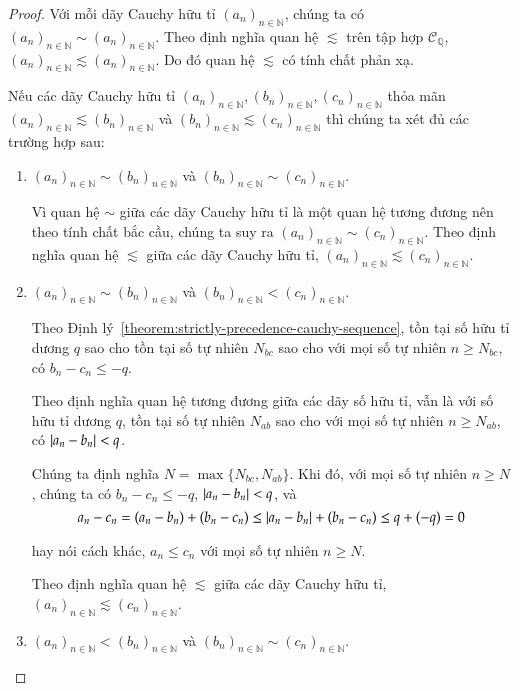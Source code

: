 \begin{proof}
    Với mỗi dãy Cauchy hữu tỉ ${(a_{n})}_{n\in\mathbb{N}}$, chúng ta có ${(a_{n})}_{n\in\mathbb{N}} \sim {(a_{n})}_{n\in\mathbb{N}}$. Theo định nghĩa quan hệ $\lesssim$ trên tập hợp $\mathscr{C}_{\mathbb{Q}}$, ${(a_{n})}_{n\in\mathbb{N}} \lesssim {(a_{n})}_{n\in\mathbb{N}}$. Do đó quan hệ $\lesssim$ có tính chất phản xạ.

    Nếu các dãy Cauchy hữu tỉ ${(a_{n})}_{n\in\mathbb{N}}, {(b_{n})}_{n\in\mathbb{N}}, {(c_{n})}_{n\in\mathbb{N}}$ thỏa mãn ${(a_{n})}_{n\in\mathbb{N}}\lesssim {(b_{n})}_{n\in\mathbb{N}}$ và ${(b_{n})}_{n\in\mathbb{N}}\lesssim {(c_{n})}_{n\in\mathbb{N}}$ thì chúng ta xét đủ các trường hợp sau:
    \begin{enumerate}[label={\textbf{Trường hợp \arabic*.}},itemindent=2cm]
        \item ${(a_{n})}_{n\in\mathbb{N}}\sim {(b_{n})}_{n\in\mathbb{N}}$ và ${(b_{n})}_{n\in\mathbb{N}}\sim {(c_{n})}_{n\in\mathbb{N}}$.

              Vì quan hệ $\sim$ giữa các dãy Cauchy hữu tỉ là một quan hệ tương đương nên theo tính chất bắc cầu, chúng ta suy ra ${(a_{n})}_{n\in\mathbb{N}}\sim {(c_{n})}_{n\in\mathbb{N}}$. Theo định nghĩa quan hệ $\lesssim$ giữa các dãy Cauchy hữu tỉ, ${(a_{n})}_{n\in\mathbb{N}}\lesssim {(c_{n})}_{n\in\mathbb{N}}$.
        \item ${(a_{n})}_{n\in\mathbb{N}}\sim {(b_{n})}_{n\in\mathbb{N}}$ và ${(b_{n})}_{n\in\mathbb{N}} < {(c_{n})}_{n\in\mathbb{N}}$.

              Theo Định lý~\ref{theorem:strictly-precedence-cauchy-sequence}, tồn tại số hữu tỉ dương $q$ sao cho tồn tại số tự nhiên $N_{bc}$ sao cho với mọi số tự nhiên $n\geq N_{bc}$, có $b_{n} - c_{n}\leq -q$.

              Theo định nghĩa quan hệ tương đương giữa các dãy số hữu tỉ, vẫn là với số hữu tỉ dương $q$, tồn tại số tự nhiên $N_{ab}$ sao cho với mọi số tự nhiên $n\geq N_{ab}$, có $\left\vert{a_{n} - b_{n}}\right\vert < q$.

              Chúng ta định nghĩa $N = \max\{ N_{bc}, N_{ab} \}$. Khi đó, với mọi số tự nhiên $n\geq N$, chúng ta có $b_{n} - c_{n}\leq -q$, $\left\vert{a_{n} - b_{n}}\right\vert < q$, và
              \[
                  a_{n} - c_{n} = (a_{n} - b_{n}) + (b_{n} - c_{n})\leq \left\vert{a_{n} - b_{n}}\right\vert + (b_{n} - c_{n})\leq q + (-q) = 0
              \]

              hay nói cách khác, $a_{n}\leq c_{n}$ với mọi số tự nhiên $n\geq N$.

              Theo định nghĩa quan hệ $\lesssim$ giữa các dãy Cauchy hữu tỉ, ${(a_{n})}_{n\in\mathbb{N}}\lesssim {(c_{n})}_{n\in\mathbb{N}}$.
        \item ${(a_{n})}_{n\in\mathbb{N}} < {(b_{n})}_{n\in\mathbb{N}}$ và ${(b_{n})}_{n\in\mathbb{N}}\sim {(c_{n})}_{n\in\mathbb{N}}$.


\end{enumerate}
\end{proof}
